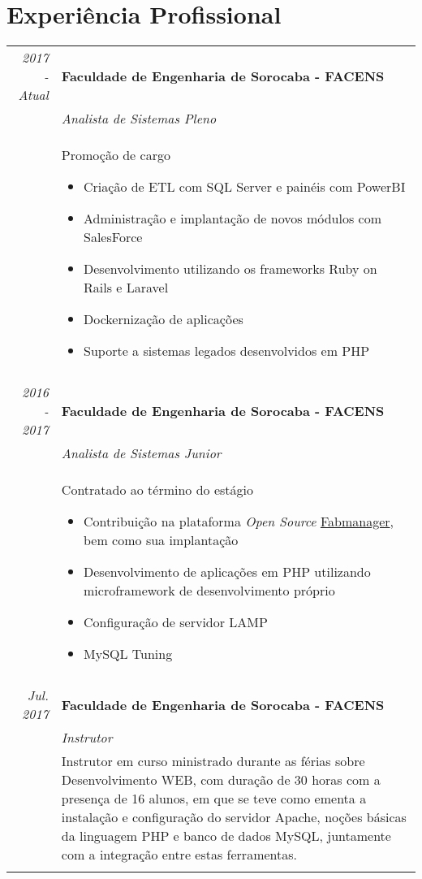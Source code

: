 \documentclass[a4paper,10pt]{article}
\begin{document}
\section{Experiência Profissional}
\begin{tabular}{r|p{11cm}}
 \emph{2017 - Atual} & \textbf{Faculdade de Engenharia de Sorocaba - FACENS} \\
 & \emph{\textit{Analista de Sistemas Pleno}} \\
 & \footnotesize{Promoção de cargo 
 \begin{itemize}
 	\item Criação de ETL com SQL Server e painéis com PowerBI
 	\item Administração e implantação de novos módulos com SalesForce
 	\item Desenvolvimento utilizando os frameworks Ruby on Rails e Laravel
 	\item Dockernização de aplicações
 	\item Suporte a sistemas legados desenvolvidos em PHP
 \end{itemize} } \\ \multicolumn{2}{c}{} \\
 
 \emph{2016 - 2017} & \textbf{Faculdade de Engenharia de Sorocaba - FACENS} \\
 & \emph{\textit{Analista de Sistemas Junior}} \\
 & \footnotesize{Contratado ao término do estágio
 \begin{itemize}
 	\item Contribuição na plataforma \textit{Open Source} \href{https://github.com/LaCasemate/fab-manager} {Fabmanager}, bem como sua implantação
 	\item Desenvolvimento de aplicações em PHP utilizando microframework de desenvolvimento próprio
 	\item Configuração de servidor LAMP
 	\item MySQL Tuning
 \end{itemize} } \\ \multicolumn{2}{c}{} \\
 
\emph{Jul. 2017} & \textbf{Faculdade de Engenharia de Sorocaba - FACENS} \\
 & \emph{\textit{Instrutor}} \\
 & \footnotesize{Instrutor em curso ministrado durante as férias sobre Desenvolvimento WEB, com duração de 30 horas com a presença de 16 alunos, em que se teve como ementa a instalação e configuração do servidor Apache, noções básicas da linguagem PHP e banco de dados MySQL, juntamente com a integração entre estas ferramentas.} \\ \multicolumn{2}{c}{} \\
  

\end{tabular}
\end{document}
